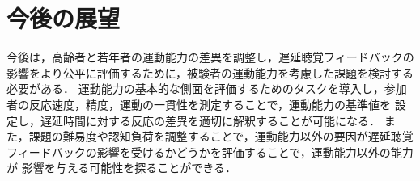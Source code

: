 \section{今後の展望}
今後は，高齢者と若年者の運動能力の差異を調整し，遅延聴覚フィードバックの影響をより公平に評価するために，被験者の運動能力を考慮した課題を検討する必要がある．
運動能力の基本的な側面を評価するためのタスクを導入し，参加者の反応速度，精度，運動の一貫性を測定することで，運動能力の基準値を
設定し，遅延時間に対する反応の差異を適切に解釈することが可能になる．
また，課題の難易度や認知負荷を調整することで，運動能力以外の要因が遅延聴覚フィードバックの影響を受けるかどうかを評価することで，運動能力以外の能力が
影響を与える可能性を探ることができる．
